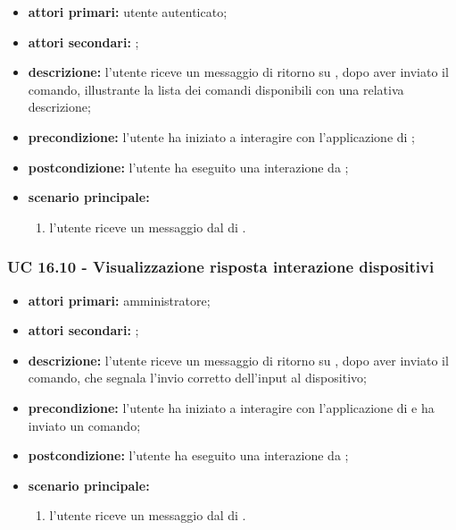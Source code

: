 	\begin{itemize}
			\item \textbf{attori primari:} utente autenticato;
			\item \textbf{attori secondari:} ;
			\item \textbf{descrizione:} l'utente riceve un messaggio di ritorno su , dopo aver inviato il comando, illustrante la lista dei comandi disponibili con una relativa descrizione;
			\item \textbf{precondizione:} l'utente ha iniziato a interagire con l'applicazione di ;
			\item \textbf{postcondizione:} l'utente ha eseguito una interazione da ;
			\item \textbf{scenario principale:}
			\begin{enumerate}
				\item l'utente riceve un messaggio dal  di .
			\end{enumerate}
		\end{itemize}


	\subsubsection{UC 16.10 - Visualizzazione risposta interazione dispositivi}

		\begin{itemize}
			\item \textbf{attori primari:} amministratore;
			\item \textbf{attori secondari:} ;
			\item \textbf{descrizione:} l'utente riceve un messaggio di ritorno su , dopo aver inviato il comando, che segnala l'invio corretto dell'input al dispositivo;
			\item \textbf{precondizione:} l'utente ha iniziato a interagire con l'applicazione di  e ha inviato un comando;
			\item \textbf{postcondizione:} l'utente ha eseguito una interazione da ;
			\item \textbf{scenario principale:}
			\begin{enumerate}
				\item l'utente riceve un messaggio dal  di .
			\end{enumerate}
		\end{itemize}
